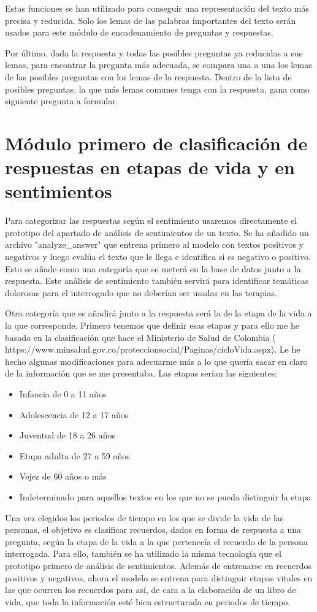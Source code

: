 Estas funciones se han utilizado para conseguir una representación del texto más precisa y reducida. Solo los lemas de las palabras importantes del texto serán usados para este módulo de encadenamiento de preguntas y respuestas.

Por último, dada la respuesta y todas las posibles preguntas ya reducidas a sus lemas, para encontrar la pregunta más adecuada, se compara una a una los lemas de las posibles preguntas con los lemas de la respuesta. Dentro de la lista de posibles preguntas, la que más lemas comunes tenga con la respuesta, gana como siguiente pregunta a formular.

\section{Módulo primero de clasificación de respuestas en etapas de vida y en sentimientos}

Para categorizar las respuestas según el sentimiento usaremos directamente el prototipo del apartado de análisis de sentimientos de un texto. Se ha añadido un archivo "analyze\_answer" que entrena primero al modelo con textos positivos y negativos y luego evalúa el texto que le llega e identifica si es negativo o positivo. Esto se añade como una categoría que se meterá en la base de datos junto a la respuesta. Este análisis de sentimiento también servirá para identificar temáticas dolorosas para el interrogado que no deberían ser usadas en las terapias. 

Otra categoría que se añadirá junto a la respuesta será la de la etapa de la vida a la que corresponde. Primero tenemos que definir esas etapas y para ello me he basado en la clasificación que hace el Ministerio de Salud de Colombia ( https://www.minsalud.gov.co/proteccionsocial/Paginas/cicloVida.aspx). Le he hecho algunas modificaciones para adecuarme más a lo que quería sacar en claro de la información que se me presentaba. Las etapas serían las siguientes:
\begin{itemize}
	\item Infancia de 0 a 11 años
	\item Adolescencia de 12 a 17 años
	\item Juventud de 18 a 26 años
	\item Etapa adulta de 27 a 59 años
	\item Vejez de 60 años o más
	\item Indeterminado para aquellos textos en los que no se pueda distinguir la etapa
\end{itemize}

Una vez elegidos los periodos de tiempo en los que se divide la vida de las personas, el objetivo es clasificar recuerdos, dados en forma de respuesta a una pregunta, según la etapa de la vida a la que pertenecía el recuerdo de la persona interrogada. Para ello, también se ha utilizado la misma tecnología que el prototipo primero de análisis de sentimientos. Además de entrenarse en recuerdos positivos y negativos, ahora el modelo se entrena para distinguir etapas vitales en las que ocurren los recuerdos para así, de cara a la elaboración de un libro de vida, que toda la información esté bien estructurada en periodos de tiempo. 


